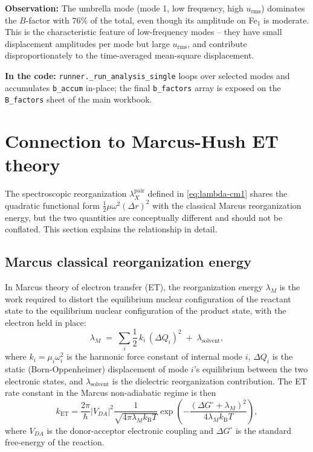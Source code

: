 \documentclass[10pt,a4paper,twoside]{article}
\newcommand{\kB}{k_{\mathrm{B}}}
\newcommand{\urms}{u_{\mathrm{rms}}}
\newcommand{\fn}[1]{\texttt{#1}}
\begin{document}
\begin{workedexample}
\textbf{Observation:} The umbrella mode (mode 1, low frequency,
high $\urms$) dominates the $B$-factor with $76\%$ of the total,
even though its amplitude on Fe$_1$ is moderate. This is the
characteristic feature of low-frequency modes -- they have small
displacement amplitudes per mode but large $\urms$, and contribute
disproportionately to the time-averaged mean-square displacement.

\textbf{In the code:}
\fn{runner.\_run\_analysis\_single} loops over selected modes and
accumulates \fn{b\_accum} in-place; the final \fn{b\_factors}
array is exposed on the \texttt{B\_factors} sheet of the main
workbook.
\end{workedexample}


\section{Connection to Marcus-Hush ET theory}
\label{sec:marcus-hush-deep}

The spectroscopic reorganization $\lambda_X^\text{pair}$ defined
in \cref{eq:lambda-cm1} shares the quadratic functional form
$\tfrac{1}{2}\mu\omega^2(\Delta r)^2$ with the classical Marcus
reorganization energy, but the two quantities are conceptually
different and should not be conflated. This section explains the
relationship in detail.

\subsection{Marcus classical reorganization energy}

In Marcus theory of electron transfer (ET), the reorganization
energy $\lambda_M$ is the work required to distort the equilibrium
nuclear configuration of the reactant state to the equilibrium
nuclear configuration of the product state, with the electron
held in place:
\begin{equation}
  \lambda_M \;=\; \sum_i \frac{1}{2}\,k_i\,(\Delta Q_i)^2
                  \;+\; \lambda_\text{solvent},
  \label{eq:marcus-classical}
\end{equation}
where $k_i = \mu_i \omega_i^2$ is the harmonic force constant of
internal mode $i$, $\Delta Q_i$ is the static (Born-Oppenheimer)
displacement of mode $i$'s equilibrium between the two electronic
states, and $\lambda_\text{solvent}$ is the dielectric
reorganization contribution. The ET rate constant in the Marcus
non-adiabatic regime is then
\begin{equation}
  k_\text{ET}
   = \frac{2\pi}{\hbar} |V_{DA}|^2
     \frac{1}{\sqrt{4\pi\lambda_M\kB T}}
     \exp\!\left(-\frac{(\Delta G^\circ + \lambda_M)^2}
                       {4\lambda_M\kB T}\right),
  \label{eq:marcus-rate}
\end{equation}
where $V_{DA}$ is the donor-acceptor electronic coupling and
$\Delta G^\circ$ is the standard free-energy of the reaction.
\end{document}
